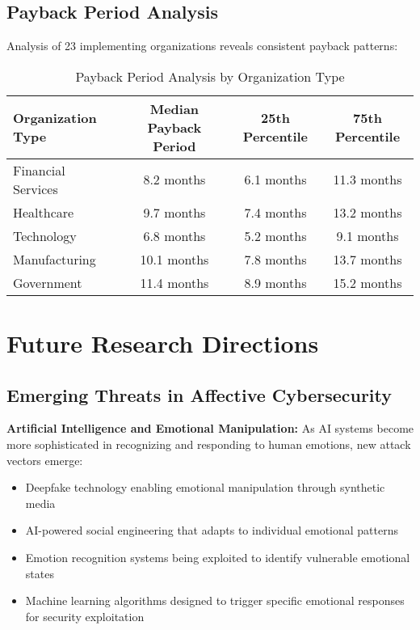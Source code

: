 \documentclass[11pt,a4paper]{article}
\begin{document}
\subsection{Payback Period Analysis}

Analysis of 23 implementing organizations reveals consistent payback patterns:

\begin{table}[H]
\centering
\caption{Payback Period Analysis by Organization Type}
\label{tab:payback_analysis}
\begin{tabular}{lccc}
\toprule
Organization Type & Median Payback Period & 25th Percentile & 75th Percentile \\
\midrule
Financial Services & 8.2 months & 6.1 months & 11.3 months \\
Healthcare & 9.7 months & 7.4 months & 13.2 months \\
Technology & 6.8 months & 5.2 months & 9.1 months \\
Manufacturing & 10.1 months & 7.8 months & 13.7 months \\
Government & 11.4 months & 8.9 months & 15.2 months \\
\bottomrule
\end{tabular}
\end{table}

\FloatBarrier

\section{Future Research Directions}

\subsection{Emerging Threats in Affective Cybersecurity}

\textbf{Artificial Intelligence and Emotional Manipulation:}
As AI systems become more sophisticated in recognizing and responding to human emotions, new attack vectors emerge:
\begin{itemize}
\item Deepfake technology enabling emotional manipulation through synthetic media
\item AI-powered social engineering that adapts to individual emotional patterns
\item Emotion recognition systems being exploited to identify vulnerable emotional states
\item Machine learning algorithms designed to trigger specific emotional responses for security exploitation
\end{itemize}
\end{document}
